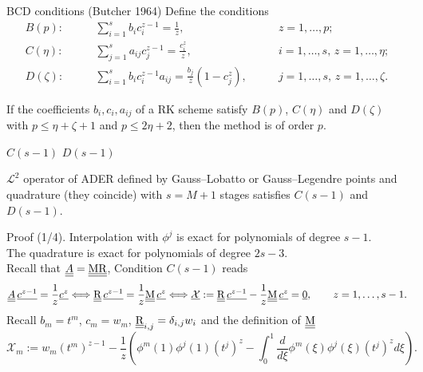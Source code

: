 \documentclass[9pt,compress,t,aspectratio=169]{beamer}
\begin{document}
\begin{frame}{BCD conditions (Butcher 1964)}
	Define the conditions
\begin{align}
	B(p):\qquad  & \sum_{i=1}^s b_i c_i^{z-1}=\frac1z,\qquad & z=1,\dots,p;\\
	C(\eta):\qquad  & \sum_{j=1}^s a_{ij} c_j^{z-1}=\frac{c_i^z}{z},\qquad & 
	i=1,\dots,s,\,z=1,\dots,\eta;\\
	D(\zeta):\qquad  & \sum_{i=1}^s b_i c_i^{z-1}a_{ij}=\frac{b_j}{z}(1-c_j^z),
	\qquad &j=1,\dots,s,\, z=1,\dots,\zeta. 
\end{align}
\begin{theorem}[Butcher 1964]
	If the coefficients $b_i,c_i,a_{ij}$ of a RK scheme satisfy $B(p)$,
    $C(\eta)$ and $D(\zeta)$ with $p\leq \eta +\zeta +1$ and $p\leq 2\eta +2$, 
	then the method is of order $p$.
\end{theorem}
\end{frame}

\begin{frame}{$C(s-1)$ $D(s-1)$}
	\begin{lemma}
		$\mathcal{L}^2$ operator of ADER defined by Gauss--Lobatto or Gauss--Legendre points and quadrature (they coincide) with $s=M+1$ stages satisfies
		 $C(s-1)$ and $D(s-1)$.
	\end{lemma}
	\begin{block}{Proof (1/4).}
		Interpolation with $\phi^j$ is exact for polynomials
		 of degree $s-1$.\\
		The quadrature is exact for polynomials of degree $2s-3$.\\
		Recall that $\underline{\underline{A}} = \underline{\underline{\mathrm{M}}} \underline{\underline{\mathrm{R}}}$, Condition $C(s-1)$  reads  \vspace*{-2mm}
		\begin{equation*}
			\underline{\underline{A}}\, \underline{c^{z-1}}  = \frac{1}{z}\underline{c^z} 
			\Longleftrightarrow \RHS \, 
			\underline{c^{z-1}}= \frac{1}{z} \M\,\underline{c^z}
			\Longleftrightarrow \underline{\mathcal{X}}:=\RHS \, 
			\underline{c^{z-1}}- \frac{1}{z} \M\,\underline{c^z}=\underline{0}, 
			\qquad z=1,\dots, s-1.\vspace*{-2mm}
		\end{equation*}
		Recall $b_m=t^m$, $c_m=w_m$, $\underline{\underline{\mathrm{R}}}_{i,j}=\delta_{i,j}w_i$ and the definition of $\underline{\underline{\mathrm{M}}}$\vspace*{-2mm}
		\begin{equation*}
			\mathcal{X}_m:=w_m (t^{m})^{z-1} - \frac{1}{z} \left( \phi^m (1) \phi^j (1) (t^j)^z -
			 \int_0^1 \frac{d}{d\xi}\phi^m(\xi) \phi^j(\xi)(t^j)^z  d\xi  \right).
		\end{equation*}
	\end{block}
\end{frame}
\end{document}
